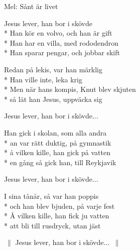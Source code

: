 \begin{SongText}
    \begin{SongInfo}
        Mel: Sånt är livet
    \end{SongInfo}
    \begin{SongVerse}
        Jesus lever, han bor i skövde\\*%
        Han kör en volvo, och han är gift\\*%
        Han har en villa, med rododendron\\*%
        Han sparar pengar, och jobbar skift
    \end{SongVerse}
    \begin{SongVerse}
        Redan på lekis, var han märklig\\*%
        Han ville inte, leka krig\\*%
        Men när hans kompis, Knut blev skjuten\\*%
        så lät han Jesus, uppväcka sig
    \end{SongVerse}
    \begin{SongVerse}
        Jesus lever, han bor i skövde...
    \end{SongVerse}
    \begin{SongVerse}
        Han gick i skolan, som alla andra\\*%
        an var rätt duktig, på gymnastik\\*%
        å vilken kille, han gick på vatten\\*%
        en gång så gick han, till Reykjavik
    \end{SongVerse}
    \begin{SongVerse}
        Jesus lever, han bor i skövde...
    \end{SongVerse}
    \begin{SongVerse}
        I sina tånår, så var han poppis\\*%
        och han blev bjuden, på varje fest\\*%
        Å vilken kille, han fick ju vatten \\*%
        att bli till rusdryck, utan jäst
    \end{SongVerse}
    \begin{SongVerse}
        $\:\|$ Jesus lever, han bor i skövde... $\:\|$
    \end{SongVerse}
\end{SongText}
